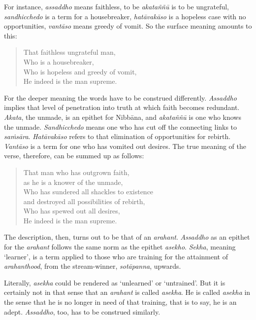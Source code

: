 For instance, \emph{assaddho} means faithless, to be \emph{akataññū} is to be ungrateful, \emph{sandhicchedo} is a term for a housebreaker, \emph{hatāvakāso} is a hopeless case with no opportunities, \emph{vantāso} means greedy of vomit. So the surface meaning amounts to this:

\begin{quote}
That faithless ungrateful man,\\
Who is a housebreaker,\\
Who is hopeless and greedy of vomit,\\
He indeed is the man supreme.
\end{quote}

For the deeper meaning the words have to be construed differently. \emph{Assaddho} implies that level of penetration into truth at which faith becomes redundant. \emph{Akata}, the unmade, is an epithet for Nibbāna, and \emph{akataññū} is one who knows the unmade. \emph{Sandhicchedo} means one who has cut off the connecting links to \emph{saṁsāra}. \emph{Hatāvakāso} refers to that elimination of opportunities for rebirth. \emph{Vantāso} is a term for one who has vomited out desires. The true meaning of the verse, therefore, can be summed up as follows:

\enlargethispage{\baselineskip}

\begin{quote}
That man who has outgrown faith,\\
\vin as he is a knower of the unmade,\\
Who has sundered all shackles to existence\\
\vin and destroyed all possibilities of rebirth,\\
Who has spewed out all desires,\\
He indeed is the man supreme.
\end{quote}

The description, then, turns out to be that of an \emph{arahant}. \emph{Assaddho} as an epithet for the \emph{arahant} follows the same norm as the epithet \emph{asekho}. \emph{Sekha}, meaning `learner', is a term applied to those who are training for the attainment of \emph{arahanthood}, from the stream-winner, \emph{sotāpanna}, upwards.

Literally, \emph{asekha} could be rendered as `unlearned' or `untrained'. But it is certainly not in that sense that an \emph{arahant} is called \emph{asekha}. He is called \emph{asekha} in the sense that he is no longer in need of that training, that is to say, he is an adept. \emph{Assaddho}, too, has to be construed similarly.


